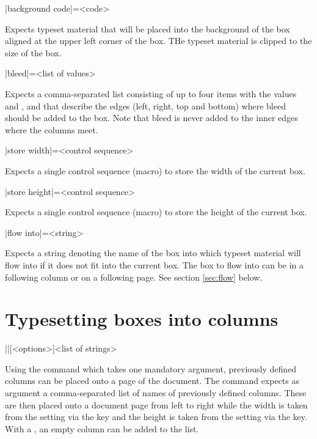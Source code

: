 \documentclass[a4paper]{article}
\begin{document}
\begin{macrodef}
|background code|={<code>}
\end{macrodef}
Expects typeset material that will be placed into the background of the box aligned at the upper left corner of the box. THe typeset material is clipped to the size of the box.

\begin{macrodef}
|bleed|={<list of values>}
\end{macrodef}
Expects a comma-separated list consisting of up to four items with the values  and ,  and  that describe the edges (left, right, top and bottom) where bleed should be added to the box. Note that bleed is never added to the inner edges where the columns meet.

\begin{macrodef}
|store width|={<control sequence>}
\end{macrodef}
Expects a single control sequence (macro) to store the width of the current box.

\begin{macrodef}
|store height|={<control sequence>}
\end{macrodef}
Expects a single control sequence (macro) to store the height of the current box.

\begin{macrodef}
|flow into|={<string>}
\end{macrodef}
Expects a string denoting the name of the box into which typeset material will flow into if it does not fit into the current box. The box to flow into can be in a following column or on a following page. See section \ref{sec:flow} below.

\section{Typesetting boxes into columns}

\begin{macrodef}
|\leporellotypesetcolumns|[<options>]{<list of strings>}
\end{macrodef}
Using the command \macro{\leporellotypesetcolumns} which takes one mandatory argument, previously defined columns can be placed onto a page of the document. The command expects as argument a comma-separated list of names of previously defined columns. These are then placed onto a document page from left to right while the width is taken from the setting via the  key and the height is taken from the setting via the  key. With a , an empty column can be added to the list.
\end{document}

